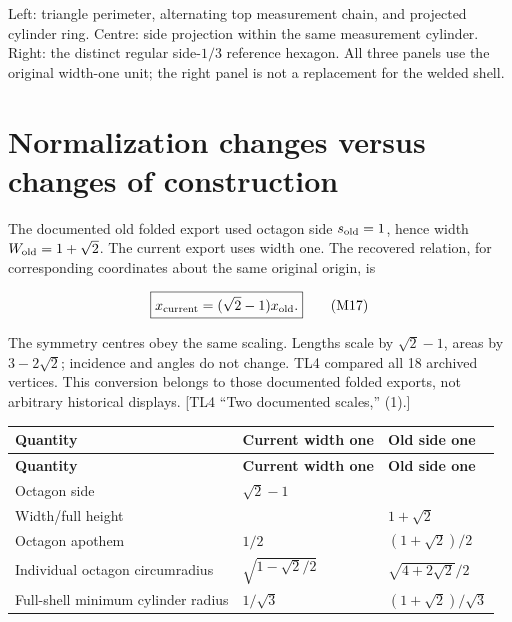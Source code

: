 \documentclass[11pt,a4paper]{article}
\begin{document}
Left: triangle perimeter, alternating top measurement chain, and projected cylinder ring. Centre: side projection within the same measurement cylinder. Right: the distinct regular side-\(1/3\) reference hexagon. All three panels use the original width-one unit; the right panel is not a replacement for the welded shell.

\section{Normalization changes versus changes of construction}

The documented old folded export used octagon side \(s_{\rm old}=1\), hence width \(W_{\rm old}=1+\sqrt2\). The current export uses width one. The recovered relation, for corresponding coordinates about the same original origin, is

\[
\boxed{x_{\rm current}=(\sqrt2-1)x_{\rm old}.}
\tag{M17}\label{eq:M17}
\]

The symmetry centres obey the same scaling. Lengths scale by \(\sqrt2-1\), areas by \(3-2\sqrt2\); incidence and angles do not change. TL4 compared all 18 archived vertices. This conversion belongs to those documented folded exports, not arbitrary historical displays. [TL4 \textquotedblleft{}Two documented scales,\textquotedblright{} (1).]

\begingroup\small\setlength{\LTpre}{5pt}\setlength{\LTpost}{7pt}
\begin{longtable}{@{}>{\raggedright\arraybackslash}p{0.2500\dimexpr\textwidth-24pt\relax}>{\raggedright\arraybackslash}p{0.3700\dimexpr\textwidth-24pt\relax}>{\raggedright\arraybackslash}p{0.3800\dimexpr\textwidth-24pt\relax}@{}}
\toprule
\textbf{Quantity} & \textbf{Current width one} & \textbf{Old side one}\\ \midrule
\endfirsthead
\textbf{Quantity} & \textbf{Current width one} & \textbf{Old side one}\\ \midrule
\endhead
\bottomrule\endfoot
Octagon side & \(\sqrt2-1\) & 1\\[4pt]
Width/\allowbreak{}full height & 1 & \(1+\sqrt2\)\\[4pt]
Octagon apothem & \(1/2\) & \((1+\sqrt2)/2\)\\[4pt]
Individual octagon circumradius & \(\sqrt{1-\sqrt2/2}\) & \(\sqrt{4+2\sqrt2}/2\)\\[4pt]
Full-shell minimum cylinder radius & \(1/\sqrt3\) & \((1+\sqrt2)/\sqrt3\)\\[4pt]
\end{longtable}\endgroup
\end{document}
